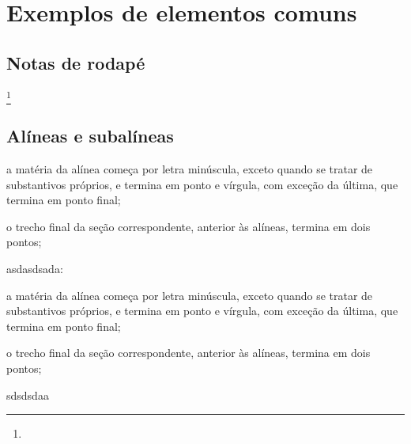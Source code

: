 \chapter{Exemplos de elementos comuns}
\section{Notas de rodapé}
  \lipsum[10]\footnote{\lipsum*[11]}

\section{Alíneas e subalíneas}
  \lipsum[12]
  \begin{alinea}
    \item a matéria da alínea começa por letra minúscula, exceto quando se tratar de     substantivos próprios, e termina em ponto e vírgula, com exceção da última, que termina em ponto final; 
    \item o trecho final da seção correspondente, anterior às alíneas, termina em
    dois pontos;
    \item asdasdsada: 
    \begin{subalinea}
      \item a matéria da alínea começa por letra minúscula, exceto quando se tratar de     substantivos próprios, e termina em ponto e vírgula, com exceção da última, que termina em ponto final; 
      \item o trecho final da seção correspondente, anterior às alíneas, termina em
      dois pontos;
    \end{subalinea}
    \item sdsdsdaa
  \end{alinea}
  
  \lipsum[13]


